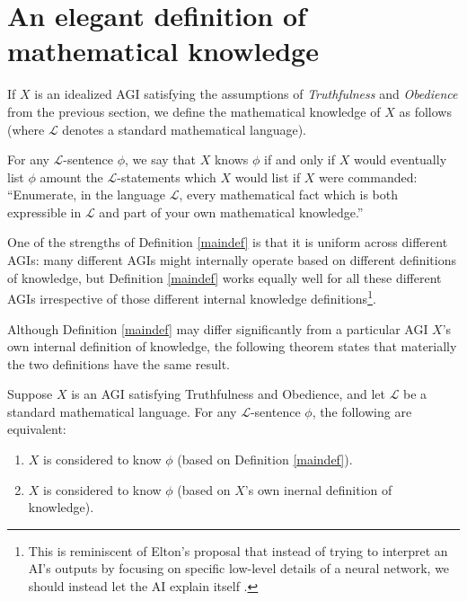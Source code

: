 \documentclass[runningheads]{llncs}
\begin{document}
\section{An elegant definition of mathematical knowledge}

If $X$ is an idealized AGI satisfying the assumptions of \emph{Truthfulness}
and \emph{Obedience} from the previous section, we define the mathematical
knowledge of $X$ as follows (where $\mathscr L$ denotes a standard mathematical
language).

\begin{definition}
\label{maindef}
  For any $\mathscr L$-sentence $\phi$, we say that $X$ knows $\phi$ if and only
  if $X$ would eventually list $\phi$ amount the $\mathscr L$-statements which $X$
  would list if $X$ were commanded:
  ``Enumerate, in the language $\mathscr L$, every mathematical fact which
  is both expressible in $\mathscr L$ and part of your own mathematical knowledge.''
\end{definition}

One of the strengths of Definition \ref{maindef} is that it is uniform across
different AGIs: many different AGIs might internally operate based on different
definitions of knowledge, but Definition \ref{maindef} works equally well for
all these different AGIs irrespective of those different internal knowledge
definitions\footnote{This is reminiscent of Elton's proposal that instead of
trying to interpret an AI's outputs by focusing on specific low-level details
of a neural network, we should instead let the AI explain itself \cite{elton}.}.

Although Definition \ref{maindef} may differ significantly from a particular AGI
$X$'s own internal definition of knowledge, the following theorem states that
materially the two definitions have the same result.

\begin{theorem}
\label{sentenceequivalence}
  Suppose $X$ is an AGI satisfying Truthfulness and Obedience, and let $\mathscr L$
  be a standard mathematical language. For any $\mathscr L$-sentence $\phi$, the following
  are equivalent:
  \begin{enumerate}
    \item $X$ is
    considered to know $\phi$ (based on Definition \ref{maindef}).
    \item
    $X$ is considered to know $\phi$ (based on $X$'s own inernal definition of
    knowledge).
  \end{enumerate}
\end{theorem}
\end{document}
